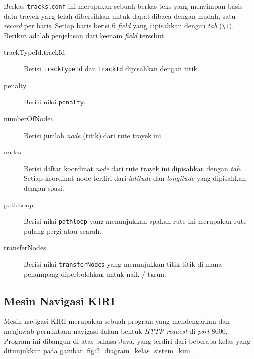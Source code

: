 Berkas \texttt{tracks.conf} ini merupakan sebuah berkas teks yang menyimpan basis data trayek yang telah dibersihkan untuk dapat dibaca dengan mudah, satu \textit{record} per baris. Setiap baris berisi 6 \textit{field} yang dipisahkan dengan \textit{tab} (\verb/\t/). Berikut adalah penjelasan dari keenam \textit{field} tersebut:

\begin{description}
	\item[trackTypeId.trackId] Berisi \texttt{trackTypeId} dan \texttt{trackId} dipisahkan dengan titik.
	\item[penalty] Berisi nilai \texttt{penalty}.
	\item[numberOfNodes] Berisi jumlah \textit{node} (titik) dari rute trayek ini.
	\item[nodes] Berisi daftar koordinat \textit{node} dari rute trayek ini dipisahkan dengan \textit{tab}. Setiap koordinat node terdiri dari \textit{latitude} dan \textit{longitude} yang dipisahkan dengan spasi.
	\item[pathLoop] Berisi nilai \texttt{pathloop} yang menunjukkan apakah rute ini merupakan rute pulang pergi atau searah.
	\item[transferNodes] Berisi nilai \texttt{transferNodes} yang menunjukkan titik-titik di mana penumpang diperbolehkan untuk naik / turun.
\end{description}

\subsection{Mesin Navigasi KIRI}

Mesin navigasi KIRI merupakan sebuah program yang mendengarkan dan menjawab permintaan navigasi dalam bentuk \textit{HTTP request} di \textit{port} 8000. Program ini dibangun di atas bahasa Java, yang terdiri dari beberapa kelas yang ditunjukkan pada gambar \ref{fig:2_diagram_kelas_sistem_kini}.

